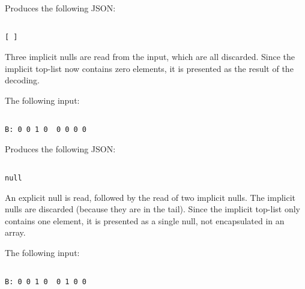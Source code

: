 Produces the following JSON:

\begin{changemargin}{-60mm}{0mm}
\begin{myquote}
\begin{verbatim}

[ ]

\end{verbatim}
\end{myquote}
\end{changemargin}

Three implicit nulls are read from the input, which are all discarded.
Since the implicit top-list now contains zero elements, it is presented
as the result of the decoding.

The following input:

\begin{changemargin}{-60mm}{0mm}
\begin{myquote}
\begin{verbatim}

B: 0 0 1 0  0 0 0 0

\end{verbatim}
\end{myquote}
\end{changemargin}

Produces the following JSON:

\begin{changemargin}{-60mm}{0mm}
\begin{myquote}
\begin{verbatim}

null

\end{verbatim}
\end{myquote}
\end{changemargin}

An explicit null is read, followed by the read of two implicit nulls.
The implicit nulls are discarded (because they are in the tail).
Since the implicit top-list only contains one element, it is presented
as a single null, not encapsulated in an array.

The following input:

\begin{changemargin}{-60mm}{0mm}
\begin{myquote}
\begin{verbatim}

B: 0 0 1 0  0 1 0 0

\end{verbatim}
\end{myquote}
\end{changemargin}

